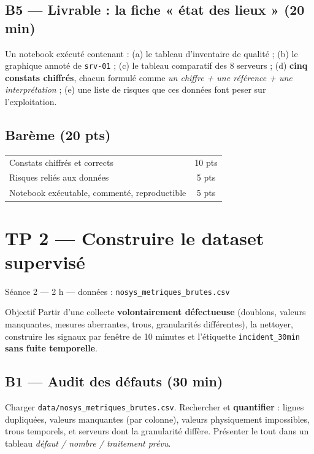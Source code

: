 \documentclass[11pt,a4paper]{article}
\newcommand{\file}[1]{\texttt{\small #1}}
\begin{document}
\subsection*{B5 --- Livrable : la fiche « état des lieux » (20 min)}
\begin{rendre}
Un notebook exécuté contenant : (a) le tableau d'inventaire de qualité ;
(b) le graphique annoté de \file{srv-01} ; (c) le tableau comparatif des
8 serveurs ; (d) \textbf{cinq constats chiffrés}, chacun formulé comme
\emph{un chiffre + une référence + une interprétation} ; (e) une liste de
risques que ces données font peser sur l'exploitation.
\end{rendre}

\subsection*{Barème (20 pts)}
\begin{center}\small
\begin{tabular}{@{}p{11.2cm}c@{}}
\toprule
Constats chiffrés et corrects & 10 pts\\
Risques reliés aux données & 5 pts\\
Notebook exécutable, commenté, reproductible & 5 pts\\
\bottomrule
\end{tabular}
\end{center}

\newpage
\section*{TP 2 --- Construire le dataset supervisé}
{\small\color{grisdoux}Séance 2 --- 2 h --- données : \file{nosys\_metriques\_brutes.csv}}

\begin{obj}{Objectif}
Partir d'une collecte \textbf{volontairement défectueuse} (doublons, valeurs
manquantes, mesures aberrantes, trous, granularités différentes), la nettoyer,
construire les signaux par fenêtre de 10 minutes et l'étiquette
\file{incident\_30min} \textbf{sans fuite temporelle}.
\end{obj}

\subsection*{B1 --- Audit des défauts (30 min)}
Charger \file{data/nosys\_metriques\_brutes.csv}. Rechercher et
\textbf{quantifier} : lignes dupliquées, valeurs manquantes (par colonne),
valeurs physiquement impossibles, trous temporels, et serveurs dont la
granularité diffère. Présenter le tout dans un tableau
\emph{défaut / nombre / traitement prévu}.
\end{document}
